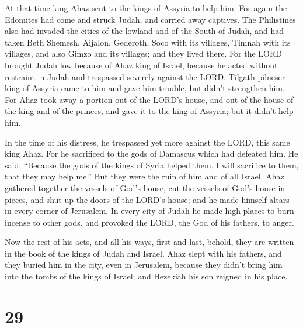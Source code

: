  At that time king Ahaz sent to the kings of Assyria to
help him.  For again the Edomites had come and struck
Judah, and carried away captives.  The Philistines also had
invaded the cities of the lowland and of the South of Judah, and had
taken Beth Shemesh, Aijalon, Gederoth, Soco with its villages, Timnah
with its villages, and also Gimzo and its villages; and they lived
there.  For the LORD brought Judah low because of Ahaz king
of Israel, because he acted without restraint in Judah and trespassed
severely against the LORD.  Tilgath-pilneser king of
Assyria came to him and gave him trouble, but didn't strengthen him.
 For Ahaz took away a portion out of the LORD's house, and
out of the house of the king and of the princes, and gave it to the king
of Assyria; but it didn't help him.

 In the time of his distress, he trespassed yet more
against the LORD, this same king Ahaz.  For he sacrificed
to the gods of Damascus which had defeated him. He said, ``Because the
gods of the kings of Syria helped them, I will sacrifice to them, that
they may help me.'' But they were the ruin of him and of all Israel.
 Ahaz gathered together the vessels of God's house, cut the
vessels of God's house in pieces, and shut up the doors of the LORD's
house; and he made himself altars in every corner of Jerusalem.
 In every city of Judah he made high places to burn incense
to other gods, and provoked the LORD, the God of his fathers, to anger.

 Now the rest of his acts, and all his ways, first and
last, behold, they are written in the book of the kings of Judah and
Israel.  Ahaz slept with his fathers, and they buried him
in the city, even in Jerusalem, because they didn't bring him into the
tombs of the kings of Israel; and Hezekiah his son reigned in his place.

\hypertarget{section-28}{%
\section{29}\label{section-28}}

